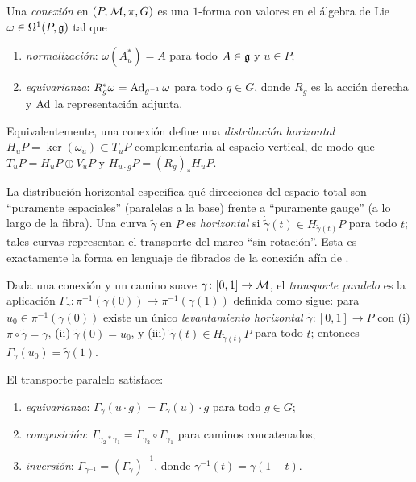 \begin{definition}[Conexi\'on]
\label{def:gauge:connection}
Una \emph{conexi\'on} en $(P, \mathcal{M}, \pi, G)$ es una $1$-forma con valores en el
\'algebra de Lie $\omega \in \Omega^1(P, \mathfrak{g})$ tal que
\begin{enumerate}
  \item \emph{normalizaci\'on}: $\omega(A^*_u) = A$ para todo $A \in \mathfrak{g}$ y
    $u \in P$;
  \item \emph{equivarianza}: $R_g^* \omega = \operatorname{Ad}_{g^{-1}} \omega$ para todo
    $g \in G$, donde $R_g$ es la acci\'on derecha y $\operatorname{Ad}$ la representaci\'on
    adjunta.
\end{enumerate}
Equivalentemente, una conexi\'on define una \emph{distribuci\'on horizontal}
$H_u P = \ker(\omega_u) \subset T_u P$ complementaria al espacio vertical, de modo
que $T_u P = H_u P \oplus V_u P$ y $H_{u \cdot g} P = (R_g)_* H_u P$.
\end{definition}

La distribuci\'on horizontal especifica qu\'e direcciones del espacio total son
``puramente espaciales'' (paralelas a la base) frente a ``puramente gauge'' (a lo
largo de la fibra). Una curva $\tilde\gamma$ en $P$ es \emph{horizontal} si
$\dot{\tilde\gamma}(t) \in H_{\tilde\gamma(t)} P$ para todo $t$; tales curvas
representan el transporte del marco ``sin rotaci\'on''. Esta es exactamente la
forma en lenguaje de fibrados de la conexi\'on af\'in de .

\begin{definition}
\label{def:gauge:parallel-transport}
Dada una conexi\'on y un camino suave $\gamma\colon [0,1] \to \mathcal{M}$, el
\emph{transporte paralelo} es la aplicaci\'on
$\Gamma_\gamma\colon \pi^{-1}(\gamma(0)) \to \pi^{-1}(\gamma(1))$ definida como
sigue: para $u_0 \in \pi^{-1}(\gamma(0))$ existe un \'unico \emph{levantamiento
horizontal} $\tilde\gamma\colon [0,1] \to P$ con (i) $\pi \circ \tilde\gamma =
\gamma$, (ii) $\tilde\gamma(0) = u_0$, y (iii) $\dot{\tilde\gamma}(t) \in
H_{\tilde\gamma(t)} P$ para todo $t$; entonces $\Gamma_\gamma(u_0) =
\tilde\gamma(1)$.
\end{definition}

\begin{theorem}
\label{thm:gauge:transport-props}
El transporte paralelo satisface:
\begin{enumerate}
  \item \emph{equivarianza}: $\Gamma_\gamma(u \cdot g) = \Gamma_\gamma(u) \cdot
    g$ para todo $g \in G$;
  \item \emph{composici\'on}: $\Gamma_{\gamma_2 * \gamma_1} = \Gamma_{\gamma_2}
    \circ \Gamma_{\gamma_1}$ para caminos concatenados;
  \item \emph{inversi\'on}: $\Gamma_{\gamma^{-1}} = (\Gamma_\gamma)^{-1}$, donde
    $\gamma^{-1}(t) = \gamma(1-t)$.
\end{enumerate}
\end{theorem}

